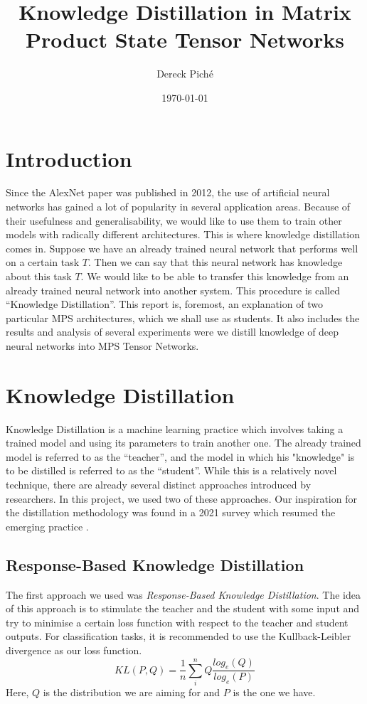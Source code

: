\documentclass{article}
\title{Knowledge Distillation in Matrix Product State Tensor Networks}
\author{Dereck Piché}
\date{\today}
\theoremstyle{definition}
\theoremstyle{definition}
\begin{document}
\maketitle

\section{Introduction}
Since the AlexNet\cite{alexnet} paper was published in 2012, the use of artificial neural networks has gained a lot of popularity in several application areas. Because of their usefulness and generalisability, we would like to use them to train other models with radically different architectures. This is where knowledge distillation comes in. Suppose we have an already trained neural network that performs well on a certain task $T$. Then we can say that this neural network has knowledge about this task $T$. We would like to be able to transfer this knowledge from an already trained neural network into another system. This procedure is called \enquote{Knowledge Distillation}. This report is, foremost, an explanation of two particular MPS architectures, which we shall use as students. It also includes the results and analysis of several experiments were we distill knowledge of deep neural networks into MPS Tensor Networks.


\section{Knowledge Distillation}
Knowledge Distillation is a machine learning practice which involves
taking a trained model and using its parameters to train another one.
The already trained model is referred to as the \enquote{teacher}, and 
the model in which his "knowledge" is to be distilled is referred to as
the \enquote{student}. While this is a relatively novel technique, there are 
already several distinct approaches introduced by researchers.
In this project, we used two of these approaches. Our inspiration for the distillation 
methodology was found in a 2021 survey which resumed the emerging 
practice \cite{Gou_2021}.

\subsection{Response-Based Knowledge Distillation}
The first approach we used was \emph{Response-Based Knowledge Distillation}. The idea of this approach is to stimulate the teacher and the student with some input and try to minimise a certain loss function with respect to the teacher and student outputs. For classification tasks, it is recommended to use the Kullback-Leibler divergence as our loss function. 
\begin{equation}
    KL(P, Q) = \frac{1}{n} \sum_i^n Q \frac{log_e(Q)}{log_e(P)}
\end{equation}
Here, $Q$ is the distribution we are aiming for and $P$ is the one we have.
\end{document}
